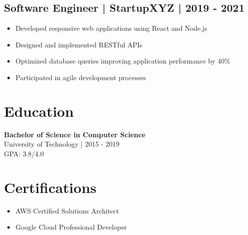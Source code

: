 \documentclass{article}
\begin{document}
\subsection*{Software Engineer | StartupXYZ | 2019 - 2021}
\begin{itemize}
    \item Developed responsive web applications using React and Node.js
    \item Designed and implemented RESTful APIs
    \item Optimized database queries improving application performance by 40\%
    \item Participated in agile development processes
\end{itemize}

\section*{Education}
\textbf{Bachelor of Science in Computer Science} \\
University of Technology | 2015 - 2019 \\
GPA: 3.8/4.0

\section*{Certifications}
\begin{itemize}
    \item AWS Certified Solutions Architect
    \item Google Cloud Professional Developer
\end{itemize}
\end{document}
